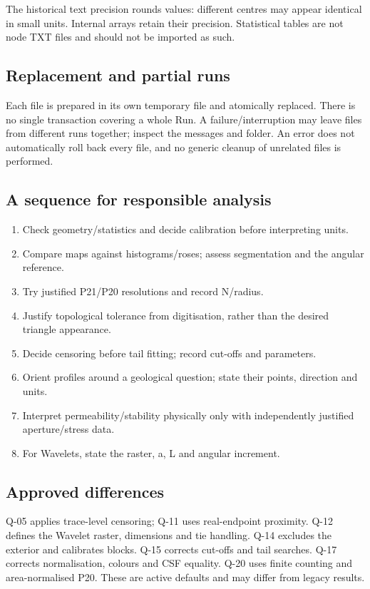 The historical text precision rounds values: different centres may appear identical in small units. Internal arrays retain their precision. Statistical tables are not node TXT files and should not be imported as such.

\subsection{Replacement and partial runs}
Each file is prepared in its own temporary file and atomically replaced. There is no single transaction covering a whole Run. A failure/interruption may leave files from different runs together; inspect the messages and folder. An error does not automatically roll back every file, and no generic cleanup of unrelated files is performed.

\label{sec:limites}
\subsection{A sequence for responsible analysis}
\begin{enumerate}
\item Check geometry/statistics and decide calibration before interpreting units.
\item Compare maps against histograms/roses; assess segmentation and the angular reference.
\item Try justified P21/P20 resolutions and record N/radius.
\item Justify topological tolerance from digitisation, rather than the desired triangle appearance.
\item Decide censoring before tail fitting; record cut-offs and parameters.
\item Orient profiles around a geological question; state their points, direction and units.
\item Interpret permeability/stability physically only with independently justified aperture/stress data.
\item For Wavelets, state the raster, a, L and angular increment.
\end{enumerate}

\subsection{Approved differences}
Q-05 applies trace-level censoring; Q-11 uses real-endpoint proximity. Q-12 defines the Wavelet raster, dimensions and tie handling. Q-14 excludes the exterior and calibrates blocks. Q-15 corrects cut-offs and tail searches. Q-17 corrects normalisation, colours and CSF equality. Q-20 uses finite counting and area-normalised P20. These are active defaults and may differ from legacy results.

